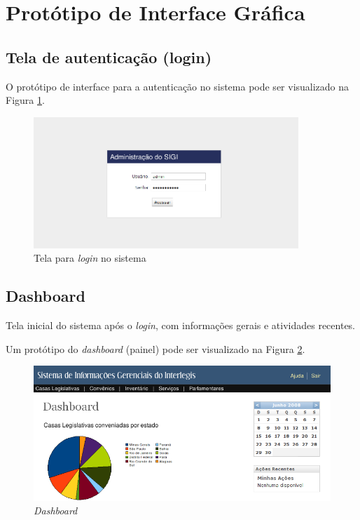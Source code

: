 %
%

\section{Protótipo de Interface Gráfica}
\label{sec:prototipo}

\subsection{Tela de autenticação (login)}
O protótipo de interface para a autenticação no sistema pode ser
visualizado na Figura \ref{fig:login}.

\begin{figure}[h]
  \centering
  \includegraphics[width=100mm]{../imagens/telalogin.png}
  \caption{Tela para \textit{login} no sistema}
  \label{fig:login}
\end{figure}

\subsection{Dashboard}
Tela inicial do sistema após o \textit{login}, com informações gerais
e atividades recentes.

Um protótipo do \textit{dashboard} (painel) pode ser visualizado na
Figura \ref{fig:dashboard}.

\begin{figure}[h]
  \centering
  \includegraphics[width=120mm]{../imagens/dashboard.png}
  \caption{\textit{Dashboard}}
  \label{fig:dashboard}
\end{figure}

